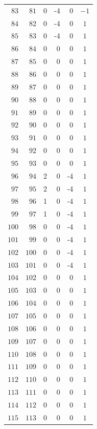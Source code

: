 {\begin{longtable}{@{}r r r r r c@{}}
\(83\) & \(81\) & 0 & -4 & 0 & \(-1\) \\
\(84\) & \(82\) & 0 & -4 & 0 & \(1\) \\
\(85\) & \(83\) & 0 & -4 & 0 & \(1\) \\
\(86\) & \(84\) & 0 & 0 & 0 & \(1\) \\
\(87\) & \(85\) & 0 & 0 & 0 & \(1\) \\
\(88\) & \(86\) & 0 & 0 & 0 & \(1\) \\
\(89\) & \(87\) & 0 & 0 & 0 & \(1\) \\
\(90\) & \(88\) & 0 & 0 & 0 & \(1\) \\
\(91\) & \(89\) & 0 & 0 & 0 & \(1\) \\
\(92\) & \(90\) & 0 & 0 & 0 & \(1\) \\
\(93\) & \(91\) & 0 & 0 & 0 & \(1\) \\
\(94\) & \(92\) & 0 & 0 & 0 & \(1\) \\
\(95\) & \(93\) & 0 & 0 & 0 & \(1\) \\
\(96\) & \(94\) & 2 & 0 & -4 & \(1\) \\
\(97\) & \(95\) & 2 & 0 & -4 & \(1\) \\
\(98\) & \(96\) & 1 & 0 & -4 & \(1\) \\
\(99\) & \(97\) & 1 & 0 & -4 & \(1\) \\
\(100\) & \(98\) & 0 & 0 & -4 & \(1\) \\
\(101\) & \(99\) & 0 & 0 & -4 & \(1\) \\
\(102\) & \(100\) & 0 & 0 & -4 & \(1\) \\
\(103\) & \(101\) & 0 & 0 & -4 & \(1\) \\
\(104\) & \(102\) & 0 & 0 & 0 & \(1\) \\
\(105\) & \(103\) & 0 & 0 & 0 & \(1\) \\
\(106\) & \(104\) & 0 & 0 & 0 & \(1\) \\
\(107\) & \(105\) & 0 & 0 & 0 & \(1\) \\
\(108\) & \(106\) & 0 & 0 & 0 & \(1\) \\
\(109\) & \(107\) & 0 & 0 & 0 & \(1\) \\
\(110\) & \(108\) & 0 & 0 & 0 & \(1\) \\
\(111\) & \(109\) & 0 & 0 & 0 & \(1\) \\
\(112\) & \(110\) & 0 & 0 & 0 & \(1\) \\
\(113\) & \(111\) & 0 & 0 & 0 & \(1\) \\
\(114\) & \(112\) & 0 & 0 & 0 & \(1\) \\
\(115\) & \(113\) & 0 & 0 & 0 & \(1\) \\

\end{longtable}}
